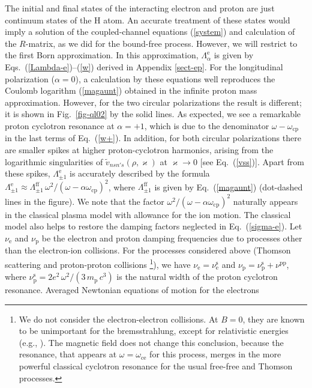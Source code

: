 \documentclass{emulateapj}
\newcommand{\req}[1]{Eq.\ (\ref{#1})}
\newcommand{\mpr}{m_\mathrm{p}}
\newcommand{\omc}{\omega_\mathrm{ce}}
\newcommand{\omp}{\omega_\mathrm{cp}}
\begin{document}
The initial and final states of the
interacting electron and proton are just continuum states
of the H atom. 
An accurate treatment of these states would imply
a solution of the coupled-channel equations (\ref{system})
and calculation of the $R$-matrix, as we did
for the bound-free process.
However, we will restrict to the first Born approximation.
In this approximation, $\Lambda_\alpha^\mathrm{e}$
is given by Eqs.\ (\ref{Lambda-e})--(\ref{w})
derived in Appendix \ref{sect-ep}.
For the longitudinal polarization ($\alpha=0$),
a calculation by these equations well
reproduces the Coulomb logarithm (\ref{magaunt})
obtained in the infinite proton mass approximation.
However, for the two circular polarizations the result is different;
it is shown in Fig.\ \ref{fig-ql02} by the solid lines.
As expected, we see a remarkable proton cyclotron resonance
at $\alpha=+1$, which is due to the denominator $\omega-\omp$
in the last terms of \req{w+}. In addition, 
for both circular polarizations there are smaller spikes
at higher proton-cyclotron harmonics, arising from 
the logarithmic singularities of $\tilde{v}_{nsn's}(\rho,\varkappa)$
at $\varkappa\to0$ [see \req{vss}]. Apart from these spikes,
$\Lambda_{\pm1}^\mathrm{e}$ is accurately described
by the formula
$\Lambda_{\pm1}^\mathrm{e}\approx 
\Lambda_{\pm1}^\mathrm{ff}\,
\omega^2/(\omega-\alpha\omp)^2$, where $\Lambda_{\pm1}^\mathrm{ff}$
is given by \req{magaunt} (dot-dashed lines in the figure).
We note that the factor $\omega^2/(\omega-\alpha\omp)^2$ 
naturally appears in the classical plasma model with allowance
for the ion motion. The classical model
also helps to restore the damping factors neglected in \req{sigma-e}.
Let $\nu_\mathrm{e}$ and $\nu_\mathrm{p}$ be the electron
and proton damping frequencies due to processes other than
the electron-ion collisions. For the processes
considered above (Thomson scattering and proton-proton collisions%
\footnote{%
We do not consider the electron-electron collisions.
At $B=0$, they are known to be
unimportant for the bremsstrahlung, except for
relativistic energies (e.g., \citealp{BetheSalpeter}).
The magnetic field does not change this conclusion,
because the resonance, that appears at $\omega=\omc$ for this process,
merges in the more powerful classical cyclotron resonance
for the usual free-free and Thomson processes.}),
we have $\nu_\mathrm{e}=\nu_\mathrm{e}^\mathrm{s}$
and $\nu_\mathrm{p}=\nu_\mathrm{p}^\mathrm{s}+\nu^\mathrm{pp}$,
where $\nu_\mathrm{p}^\mathrm{s}=2e^2 \,\omega^2 / (3\,\mpr \,c^3)$
is the natural width of the proton cyclotron resonance.
Averaged Newtonian equations of motion for the electrons
\end{document}
